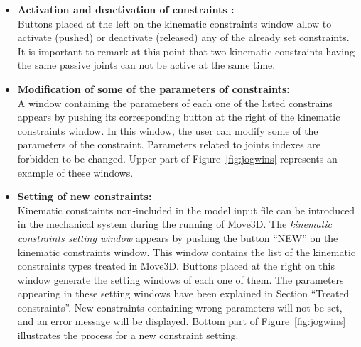 \begin{itemize}
\item {\bf Activation and deactivation of constraints :} \\
Buttons placed at the left on the kinematic constraints window allow
to activate (pushed) or deactivate (released) any of the already set
constraints. It is important to remark at this point that two kinematic
constraints having the same passive joints can not be active at the
same time.
\item {\bf Modification of some of the parameters of constraints:} \\
A window containing the parameters of each one of the listed constrains 
appears by pushing its corresponding button at the right of the
kinematic constraints window. In this window, the user can modify
some of the parameters of the constraint. Parameters related to joints 
indexes are forbidden to be changed. Upper part of Figure~\ref{fig:jogwins}
represents an example of these windows.
\item {\bf Setting of new constraints:} \\
Kinematic constraints non-included in the model input file can be
introduced in the mechanical system during the running of Move3D. The
{\em kinematic constraints setting window} appears by pushing the button
``NEW'' on the kinematic constraints window. This window contains the 
list of the kinematic constraints types treated in Move3D. Buttons
placed at the right on this window generate the setting windows of
each one of them. The parameters appearing in these setting windows
have been explained in Section ``Treated constraints''. New
constraints containing wrong parameters will not be set, and an error
message will be displayed. Bottom part of Figure~\ref{fig:jogwins} illustrates
the process for a new constraint setting.
\end{itemize}

